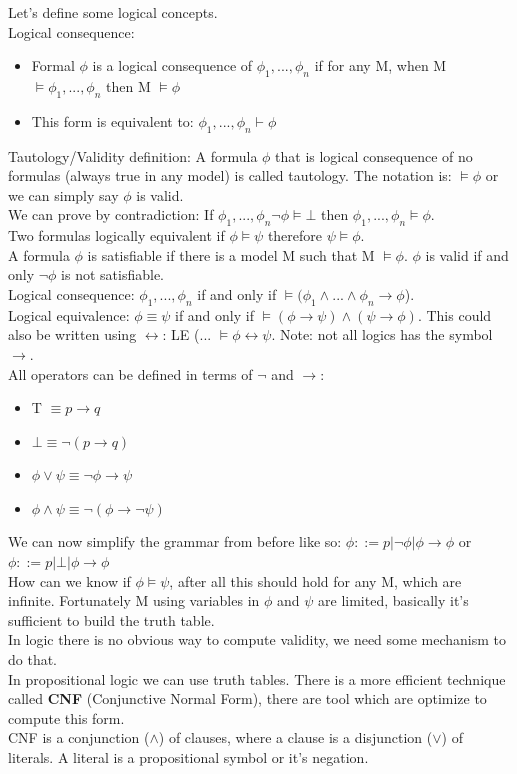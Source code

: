 \documentclass[12pt]{article}
\begin{document}
Let's define some logical concepts. 
\\ Logical consequence: 
\begin{itemize}
    \item Formal $\phi$ is a logical consequence of $\phi_1,...,\phi_n$ if for any M, when M $\models \phi_1,...,\phi_n$ then M $\models \phi$
    \item This form is equivalent to: $\phi_1,...,\phi_n \vdash \phi$
\end{itemize}
Tautology/Validity definition: A formula $\phi$ that is logical consequence of no formulas (always true in any model) is called tautology. 
The notation is: $\models \phi$ or we can simply say $\phi$ is valid.
\\ We can prove by contradiction: If $\phi_1,...,\phi_n \neg \phi \models \bot$ then $\phi_1,...,\phi_n \models \phi$.
\\ Two formulas logically equivalent if $\phi \models \psi$ therefore $\psi \models \phi$.
\\ A formula $\phi$ is satisfiable if there is a model M such that M $\models \phi$. $\phi$ is valid if and only $\neg \phi$ is not satisfiable. 
\\ Logical consequence: $\phi_1, ... , \phi_n$ if and only if $\models ( \phi_1 \land ... \land \phi_n \rightarrow \phi$).
\vspace{2mm}
\\ Logical equivalence: $\phi \equiv \psi$ if and only if $\models (\phi \rightarrow \psi) \land (\psi \rightarrow \phi)$. This could also be written using $\leftrightarrow$: LE (... $\models \phi \leftrightarrow \psi$. Note: not all logics has the symbol $\rightarrow$.
\vspace{2mm} 
\\ All operators can be defined in terms of $\neg$ and $\rightarrow$: 
\begin{itemize}
    \item T $\equiv p \rightarrow q$
    \item $\bot \equiv \neg (p \rightarrow q)$
    \item $\phi \lor \psi \equiv \neg \phi \rightarrow \psi$
    \item $\phi \land \psi \equiv \neg (\phi \rightarrow \neg \psi)$
\end{itemize}
We can now simplify the grammar from before like so: $\phi ::= p | \neg \phi | \phi \rightarrow \phi$ or $\phi ::= p | \bot | \phi \rightarrow \phi$
\\ How can we know if $\phi \models \psi$, after all this should hold for any M, which are infinite. 
Fortunately M using variables in $\phi$ and $\psi$ are limited, basically it's sufficient to build the truth table.
\\ In logic there is no obvious way to compute validity, we need some mechanism to do that.
\\ In propositional logic we can use truth tables.
There is a more efficient technique called \textbf{CNF} (Conjunctive Normal Form), there are tool which are optimize to compute this form. 
\\ CNF is a conjunction ($\land$) of clauses, where a clause is a disjunction ($\lor$) of literals. A literal is a propositional symbol or it's negation.
\end{document}
